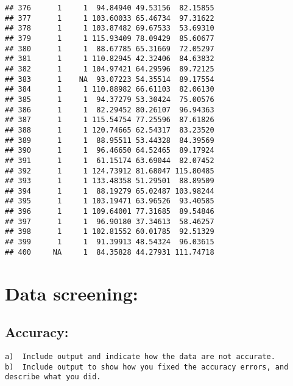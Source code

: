 \documentclass[
]{article}
\newenvironment{Shaded}{\begin{snugshade}}{\end{snugshade}}
\newcommand{\CommentTok}[1]{\textcolor[rgb]{0.56,0.35,0.01}{\textit{#1}}}
\newcommand{\KeywordTok}[1]{\textcolor[rgb]{0.13,0.29,0.53}{\textbf{#1}}}
\newcommand{\NormalTok}[1]{#1}
\newcommand{\OperatorTok}[1]{\textcolor[rgb]{0.81,0.36,0.00}{\textbf{#1}}}
\newcommand{\StringTok}[1]{\textcolor[rgb]{0.31,0.60,0.02}{#1}}
\begin{document}
\begin{verbatim}
## 376      1     1  94.84940 49.53156  82.15855
## 377      1     1 103.60033 65.46734  97.31622
## 378      1     1 103.87482 69.67533  53.69310
## 379      1     1 115.93409 78.09429  85.60677
## 380      1     1  88.67785 65.31669  72.05297
## 381      1     1 110.82945 42.32406  84.63832
## 382      1     1 104.97421 64.29596  89.72125
## 383      1    NA  93.07223 54.35514  89.17554
## 384      1     1 110.88982 66.61103  82.06130
## 385      1     1  94.37279 53.30424  75.00576
## 386      1     1  82.29452 80.26107  96.94363
## 387      1     1 115.54754 77.25596  87.61826
## 388      1     1 120.74665 62.54317  83.23520
## 389      1     1  88.95511 53.44328  84.39569
## 390      1     1  96.46650 64.52465  89.17924
## 391      1     1  61.15174 63.69044  82.07452
## 392      1     1 124.73912 81.68047 115.80485
## 393      1     1 133.48358 51.29501  88.89509
## 394      1     1  88.19279 65.02487 103.98244
## 395      1     1 103.19471 63.96526  93.40585
## 396      1     1 109.64001 77.31685  89.54846
## 397      1     1  96.90180 37.34613  58.46257
## 398      1     1 102.81552 60.01785  92.51329
## 399      1     1  91.39913 48.54324  96.03615
## 400     NA     1  84.35828 44.27931 111.74718
\end{verbatim}

\hypertarget{data-screening}{%
\section{Data screening:}\label{data-screening}}

\hypertarget{accuracy}{%
\subsection{Accuracy:}\label{accuracy}}

\begin{verbatim}
a)  Include output and indicate how the data are not accurate.
b)  Include output to show how you fixed the accuracy errors, and describe what you did.
\end{verbatim}

\begin{Shaded}
\end{Shaded}
\end{document}
